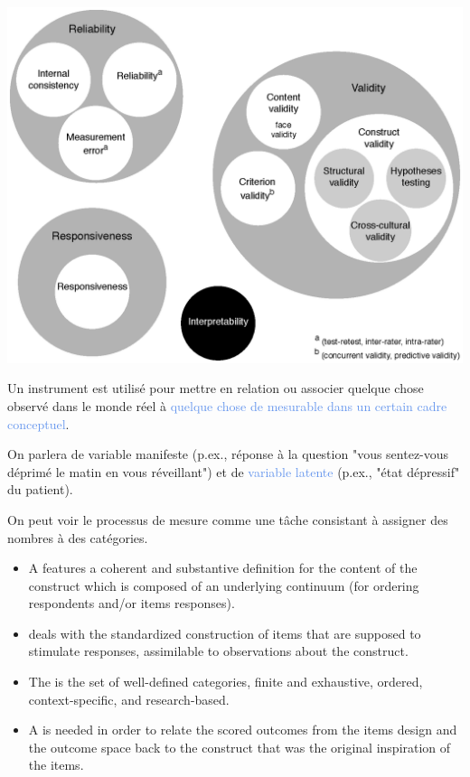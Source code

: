{\centering \includegraphics[width=.5\textwidth]{figs/cosmin_taxonomy.eps}\par}



Un instrument est utilisé pour mettre en relation ou associer
\textcolor{Apricot}{quelque chose observé dans le monde réel} à
\textcolor{CornflowerBlue}{quelque chose de mesurable dans un certain cadre
  conceptuel}.

On parlera de \textcolor{Apricot}{variable manifeste} (p.ex., réponse à la
question "vous sentez-vous déprimé le matin en vous réveillant") et de
\textcolor{CornflowerBlue}{variable latente} (p.ex., "état dépressif" du
patient). 

On peut voir le processus de mesure comme une tâche consistant à assigner des
nombres à des catégories\autocite{Stevens1946,DeBoeck2005}.


\begin{itemize}
\item A  features a coherent and substantive
  definition for the content of the construct which is composed of an
  underlying continuum (for ordering respondents and/or items
  responses).
\item {} deals with the standardized
  construction of items that are supposed to stimulate responses,
  assimilable to observations about the construct. 
\item The  is the set of well-defined
  categories, finite and exhaustive, ordered, context-specific, and
  research-based.
\item A  is needed in order to relate the
  scored outcomes from the items design and the outcome space back to
  the construct that was the original inspiration of the items.
\end{itemize}



